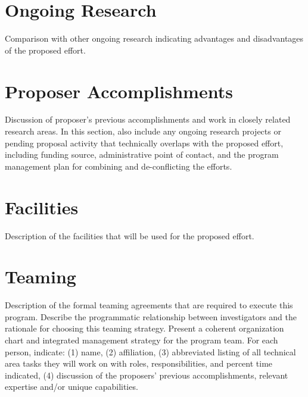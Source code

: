 \section{Ongoing Research}
Comparison with other ongoing research indicating advantages and disadvantages of the
proposed effort.
\section{Proposer Accomplishments}
Discussion of proposer’s previous accomplishments and work in closely related research
areas. In this section, also include any ongoing research projects or pending proposal activity
that technically overlaps with the proposed effort, including funding source, administrative
point of contact, and the program management plan for combining and de-conflicting the
efforts.
\section{Facilities}
Description of the facilities that will be used for the proposed effort.
\section{Teaming}
Description of the formal teaming agreements that are required to execute this program.
Describe the programmatic relationship between investigators and the rationale for choosing
this teaming strategy. Present a coherent organization chart and integrated management
strategy for the program team. For each person, indicate: (1) name, (2) affiliation, (3)
abbreviated listing of all technical area tasks they will work on with roles, responsibilities,
and percent time indicated, (4) discussion of the proposers’ previous accomplishments,
relevant expertise and/or unique capabilities.
